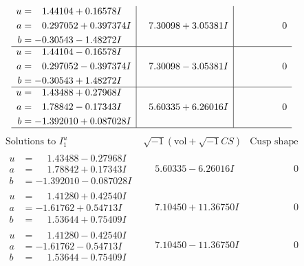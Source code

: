 \documentclass[1p]{elsarticle_modified}
\theoremstyle{definition}
\newcommand{\I}{\sqrt{-1}}
\begin{document}
$$\begin{array}{c|c|c}
\begin{aligned}
u &= \phantom{-}1.44104 + 0.16578 I \\
a &= \phantom{-}0.297052 + 0.397374 I \\
b &= -0.30543 - 1.48272 I\end{aligned}
 & \phantom{-}7.30098 + 3.05381 I & \phantom{-0.000000 } 0 \\ \hline\begin{aligned}
u &= \phantom{-}1.44104 - 0.16578 I \\
a &= \phantom{-}0.297052 - 0.397374 I \\
b &= -0.30543 + 1.48272 I\end{aligned}
 & \phantom{-}7.30098 - 3.05381 I & \phantom{-0.000000 } 0 \\ \hline\begin{aligned}
u &= \phantom{-}1.43488 + 0.27968 I \\
a &= \phantom{-}1.78842 - 0.17343 I \\
b &= -1.392010 + 0.087028 I\end{aligned}
 & \phantom{-}5.60335 + 6.26016 I & \phantom{-0.000000 } 0\\
 \hline 
 \end{array}$$\newpage$$\begin{array}{c|c|c}  
\text{Solutions to }I^u_{1}& \I (\text{vol} + \sqrt{-1}CS) & \text{Cusp shape}\\
 \hline 
\begin{aligned}
u &= \phantom{-}1.43488 - 0.27968 I \\
a &= \phantom{-}1.78842 + 0.17343 I \\
b &= -1.392010 - 0.087028 I\end{aligned}
 & \phantom{-}5.60335 - 6.26016 I & \phantom{-0.000000 } 0 \\ \hline\begin{aligned}
u &= \phantom{-}1.41280 + 0.42540 I \\
a &= -1.61762 + 0.54713 I \\
b &= \phantom{-}1.53644 + 0.75409 I\end{aligned}
 & \phantom{-}7.10450 + 11.36750 I & \phantom{-0.000000 } 0 \\ \hline\begin{aligned}
u &= \phantom{-}1.41280 - 0.42540 I \\
a &= -1.61762 - 0.54713 I \\
b &= \phantom{-}1.53644 - 0.75409 I\end{aligned}
 & \phantom{-}7.10450 - 11.36750 I & \phantom{-0.000000 } 0 \\ \hline\begin{aligned}

\end{aligned}
\end{array}$$
\end{document}

